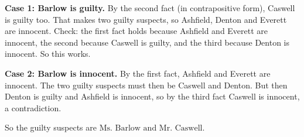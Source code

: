 \textbf{Case 1: Barlow is guilty.} By the second fact (in contrapositive form), Caswell is guilty too. That makes two guilty suspects, so Ashfield, Denton and Everett are innocent. Check: the first fact holds because Ashfield and Everett are innocent, the second because Caswell is guilty, and the third because Denton is innocent. So this works.

\textbf{Case 2: Barlow is innocent.} By the first fact, Ashfield and Everett are innocent. The two guilty suspects must then be Caswell and Denton. But then Denton is guilty and Ashfield is innocent, so by the third fact Caswell is innocent, a contradiction.

So the guilty suspects are $\boxed{\text{Ms.\ Barlow and Mr.\ Caswell}}$.
